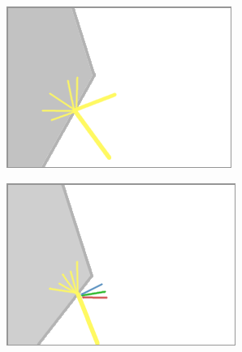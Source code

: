	{
		\begin{figure}
			\centering
			\begin{subfigure}{\textwidth}
				\centering
				\includegraphics[width=\textwidth, height=0.35\textheight, keepaspectratio]{images/Skizzen/lichteffekt-reflektion}
			\end{subfigure}
			\begin{subfigure}{\textwidth}
				\centering
				\includegraphics[width=\textwidth, height=0.35\textheight, keepaspectratio]{images/Skizzen/lichteffekt-diffus-reflektion}
			\end{subfigure}
	\end{figure}
}

